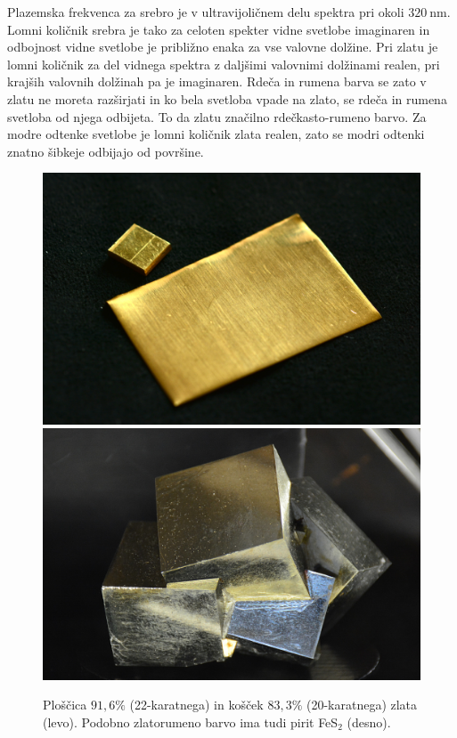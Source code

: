 Plazemska frekvenca za srebro je v ultravijoličnem delu spektra 
pri okoli $320~\si{\nano\meter}$. Lomni količnik srebra je tako za celoten 
spekter vidne svetlobe imaginaren in odbojnost
vidne svetlobe je približno enaka za vse valovne dolžine.  
Pri zlatu je lomni 
količnik za del vidnega spektra z daljšimi valovnimi dolžinami realen, pri 
krajših valovnih dolžinah pa je imaginaren. Rdeča in rumena barva se zato v zlatu 
ne moreta razširjati in ko bela svetloba vpade na zlato, se rdeča in rumena svetloba
od njega odbijeta. To da zlatu značilno rdečkasto-rumeno barvo. Za modre odtenke
svetlobe je lomni količnik zlata realen, zato se modri odtenki znatno šibkeje odbijajo od površine.
\begin{figure}[htp]
\centering
\includegraphics[width=7truecm]{slike/09_zlato.jpg}\hfill
\includegraphics[width=7truecm]{slike/09_pirit.jpg}
\caption{Ploščica $91,6\%$ (22-karatnega) in košček $83,3\%$ (20-karatnega) zlata (levo). 
Podobno zlatorumeno barvo ima tudi pirit FeS$_2$ (desno).}
\label{fig:09_zlato}
\end{figure}
